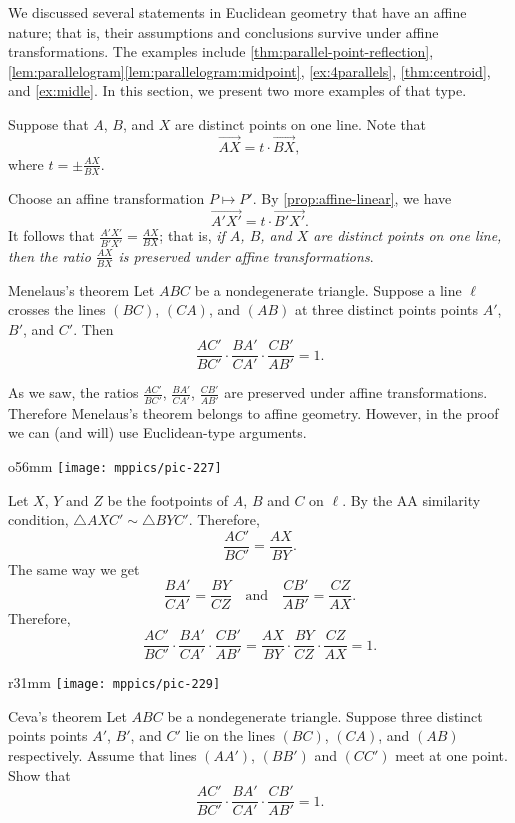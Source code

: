 We discussed several statements in Euclidean geometry that have an affine nature;
that is, their assumptions and conclusions survive under affine transformations.
The examples include 
\ref{thm:parallel-point-reflection},
\ref{lem:parallelogram}\ref{lem:parallelogram:midpoint},
\ref{ex:4parallels},
\ref{thm:centroid},
and \ref{ex:midle}.
In this section, we present two more examples of that type.

Suppose that $A$, $B$, and $X$ are distinct points on one line.
Note that 
\[\overrightarrow{AX}=t\cdot \overrightarrow{BX},\]
where $t=\pm\frac{AX}{BX}$.

Choose an affine transformation $P\mapsto P'$.
By \ref{prop:affine-linear}, we have 
\[\overrightarrow{A'X'}=t\cdot \overrightarrow{B'X'}.\]
It follows that $\frac{A'X'}{B'X'}=\frac{AX}{BX}$;
that is, \textit{if $A$, $B$, and $X$ are distinct points on one line, then the ratio $\frac{AX}{BX}$ is preserved under affine transformations}.

\begin{thm}{Menelaus's theorem}
Let $ABC$ be a nondegenerate triangle.
Suppose a line $\ell$ crosses the lines $(BC)$, $(CA)$, and $(AB)$ at three distinct points points $A'$, $B'$, and $C'$.
Then 
\[\frac{AC'}{BC'}\cdot\frac{BA'}{CA'}\cdot \frac{CB'}{AB'}=1.\]
\end{thm}

As we saw, the ratios $\frac{AC'}{BC'}$, $\frac{BA'}{CA'}$, $\frac{CB'}{AB'}$ are preserved under affine transformations.
Therefore Menelaus's theorem belongs to affine geometry.
However, in the proof we can (and will) use Euclidean-type arguments.

\begin{wrapfigure}{o}{56mm}
\centering
\vskip-0mm
\texttt{[image: mppics/pic-227]}
\end{wrapfigure}

Let $X$, $Y$ and $Z$ be the footpoints of $A$, $B$ and $C$ on $\ell$.
By the AA similarity condition, $\triangle AXC'\sim \triangle BYC'$.
Therefore, 
\[\frac{AC'}{BC'}=\frac{AX}{BY}.\]
The same way we get
\[\frac{BA'}{CA'}=\frac{BY}{CZ}
\quad\text{and}\quad
\frac{CB'}{AB'}=\frac{CZ}{AX}.\]
Therefore,
\[\frac{AC'}{BC'}\cdot\frac{BA'}{CA'}\cdot \frac{CB'}{AB'}=\frac{AX}{BY}\cdot \frac{BY}{CZ}\cdot \frac{CZ}{AX}=1.\]
\qedsf

{

\begin{wrapfigure}{r}{31mm}
\centering
\vskip-2mm
\texttt{[image: mppics/pic-229]}
\end{wrapfigure}

\begin{thm}{Ceva's theorem}\label{thm:ceva-affine}
Let $ABC$ be a nondegenerate triangle.
Suppose three distinct points points $A'$, $B'$, and $C'$ lie on the lines $(BC)$, $(CA)$, and $(AB)$ respectively.
Assume that lines $(AA')$, $(BB')$ and $(CC')$ meet at one point.
Show that
\[\frac{AC'}{BC'}\cdot\frac{BA'}{CA'}\cdot \frac{CB'}{AB'}=1.\]
\end{thm}

}

